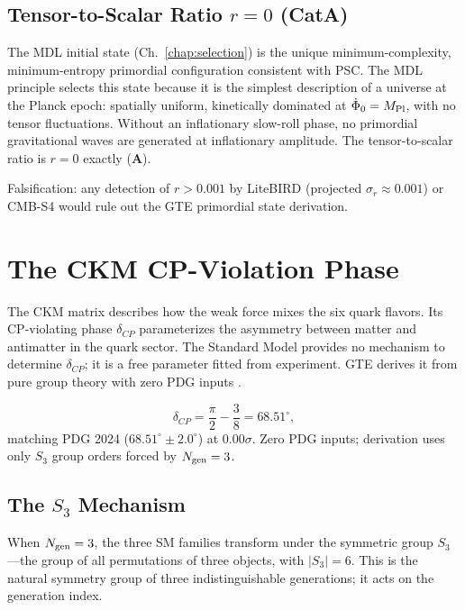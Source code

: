 \documentclass[11pt,openany]{book}
\theoremstyle{remark}
\newcommand{\MPl}{M_{\rm Pl}}
\newcommand{\CatA}{\textbf{A}}
\newcommand{\CatAL}{\ensuremath{\textbf{A}_{\rm Lean}}}
\begin{document}
\subsection*{Tensor-to-Scalar Ratio \texorpdfstring{$r = 0$}{r = 0} (CatA)}

The MDL initial state (Ch.~\ref{chap:selection}) is the unique minimum-complexity,
minimum-entropy primordial configuration consistent with PSC.
The MDL principle selects this state because it is the simplest description of
a universe at the Planck epoch: spatially uniform, kinetically dominated at
$\dot{\Phi}_0 = \MPl$, with no tensor fluctuations.
Without an inflationary slow-roll phase, no primordial gravitational waves are
generated at inflationary amplitude.
The tensor-to-scalar ratio is $r = 0$ exactly (\CatA).

Falsification: any detection of $r > 0.001$ by LiteBIRD (projected $\sigma_r \approx 0.001$)
or CMB-S4 would rule out the GTE primordial state derivation.

\section{The CKM CP-Violation Phase}
\label{sec:cp}

The CKM matrix describes how the weak force mixes the six quark flavors.
Its CP-violating phase $\delta_{CP}$ parameterizes the asymmetry between matter and
antimatter in the quark sector.
The Standard Model provides no mechanism to determine $\delta_{CP}$; it is a free
parameter fitted from experiment.
GTE derives it from pure group theory with zero PDG inputs \cite{SpivackCKM}.

\begin{tcolorbox}[colback=orange!5,colframe=orange!60,
  title={Result: CKM CP-Violation Phase (\CatAL)}]
  \[
    \delta_{CP}
    = \frac{\pi}{2} - \frac{3}{8}
    = 68.51^\circ,
  \]
  matching PDG 2024 ($68.51^\circ \pm 2.0^\circ$) at $0.00\sigma$.
  Zero PDG inputs; derivation uses only $S_3$ group orders forced by $N_{\rm gen} = 3$.
\end{tcolorbox}

\subsection*{The $S_3$ Mechanism}

When $N_{\rm gen} = 3$, the three SM families transform under the symmetric group
$S_3$---the group of all permutations of three objects, with $|S_3| = 6$.
This is the natural symmetry group of three indistinguishable generations; it acts
on the generation index.
\end{document}

